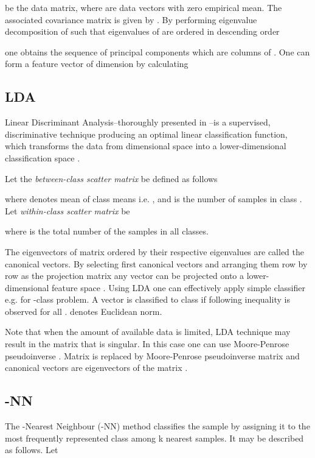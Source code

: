 \documentclass[]{article}
\begin{document}
be the data matrix, where  are data vectors with zero
empirical mean. The associated covariance matrix is given by
. 
By performing eigenvalue decomposition of 
 such that 
eigenvalues   of  are ordered in 
descending order

one obtains the sequence of principal components 
 which are columns of 
 \cite{Wall:2003}.
One can form a feature vector  of dimension  by 
calculating 

\subsection{LDA} \label{LDA}
Linear Discriminant Analysis--thoroughly presented in
\cite{Koronacki:2005}--is a supervised, discriminative technique producing an
optimal linear classification function, which transforms the data from
 dimensional space
 into a lower-dimensional classification space .

Let the \emph{between-class scatter matrix}  be defined as follows

where  denotes mean of class means  i.e.	
, and  is the 
number of samples in class . 
Let \emph{within-class scatter matrix}  be

where  is the total number of the samples in all classes.

The eigenvectors of matrix  ordered by their respective
eigenvalues are called the canonical vectors. By selecting first  canonical
vectors and arranging them row by row as the projection matrix 
 any vector  can be projected onto a
lower-dimensional feature space . Using LDA one can effectively 
apply simple classifier e.g. for -class problem. A vector  is 
classified to class  if following inequality is observed 
for all .  denotes Euclidean norm.

Note that when the amount of available data is limited, LDA technique may result
in the matrix  that is singular.
In this case one can use Moore-Penrose pseudoinverse \cite{Tian:88}.
Matrix  is replaced by Moore-Penrose pseudoinverse matrix
 and canonical vectors are eigenvectors of the matrix
.

\subsection{-NN} \label{KNN}
The -Nearest Neighbour (-NN) method \cite{Hechenbichler:2004}
classifies the sample by assigning it to the  most frequently represented class
among k nearest samples. It may be described as follows. Let 
\end{document}
